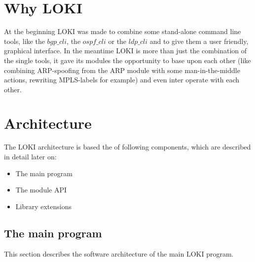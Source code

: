 \documentclass[a4paper, 11pt]{article}
\begin{document}
    \tableofcontents
    \newpage
    \lstlistoflistings
    \newpage

    \section{Why LOKI}

    At the beginning LOKI was made to combine some stand-alone command line tools, like the $bgp\_cli$, the $ospf\_cli$ or the $ldp\_cli$ and to give them a user friendly, graphical interface. In the meantime LOKI is more than just the combination of the single tools, it gave its modules the opportunity to base upon each other (like combining ARP-spoofing from the ARP module with some man-in-the-middle actions, rewriting MPLS-labels for example) and even inter operate with each other.

    \section{Architecture}

        The LOKI architecture is based the of following components, which are described in detail later on:
    
        \begin{itemize}
            \item The main program
            \item The module API
            \item Library extensions
        \end{itemize}

        \subsection{The main program}
        This section describes the software architecture of the main LOKI program.
        
\end{document}
